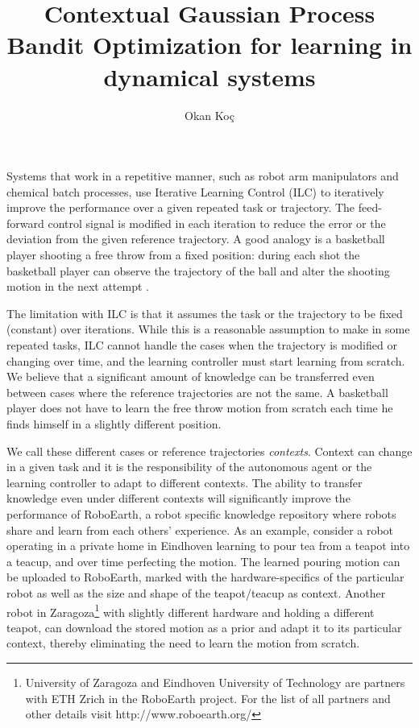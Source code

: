 \documentclass[10pt,a4paper]{article}
\author{Okan Ko\c c}
\title{Contextual Gaussian Process Bandit Optimization for learning in dynamical systems}
\begin{document}
\maketitle


Systems that work in a repetitive manner, such as robot arm manipulators and chemical batch processes, use Iterative Learning Control (ILC) to iteratively improve the performance over a given repeated task or trajectory. The feed-forward control signal is modified in each iteration to reduce the error or the deviation from the given reference trajectory. A good analogy is a basketball player shooting a free throw from a fixed position: during each shot the basketball player can observe the trajectory of the ball and alter the shooting motion in the next attempt \cite{Survey}. 

The limitation with ILC is that it assumes the task or the trajectory to be fixed (constant) over iterations. While this is a reasonable assumption to make in some repeated tasks, ILC cannot handle the cases when the trajectory is modified or changing over time, and the learning controller must start learning from scratch. We believe that a significant amount of knowledge can be transferred even between cases where the reference trajectories are not the same. A basketball player does not have to learn the free throw motion from scratch each time he finds himself in a slightly different position. 


We call these different cases or reference trajectories \textit{contexts}. Context can change in a given task and it is the responsibility of the autonomous agent or the learning controller to adapt to different contexts. The ability to transfer knowledge even under different contexts will significantly improve the performance of RoboEarth\cite{RoboEarth}, a robot specific knowledge repository where robots share and learn from each others' experience. As an example, consider a robot operating in a private home in Eindhoven learning to pour tea from a teapot into a teacup, and over time perfecting the motion. The learned pouring motion can be uploaded to RoboEarth, marked with the hardware-specifics of the particular robot as well as the size and shape of the teapot/teacup as context. Another robot in Zaragoza\footnote{University of Zaragoza and Eindhoven University of Technology are partners with ETH Zrich in the RoboEarth project. For the list of all partners and other details visit http://www.roboearth.org/} with slightly different hardware and holding a different teapot, can download the stored motion as a prior and adapt it to its particular context, thereby eliminating the need to learn the motion from scratch. 
\end{document}
